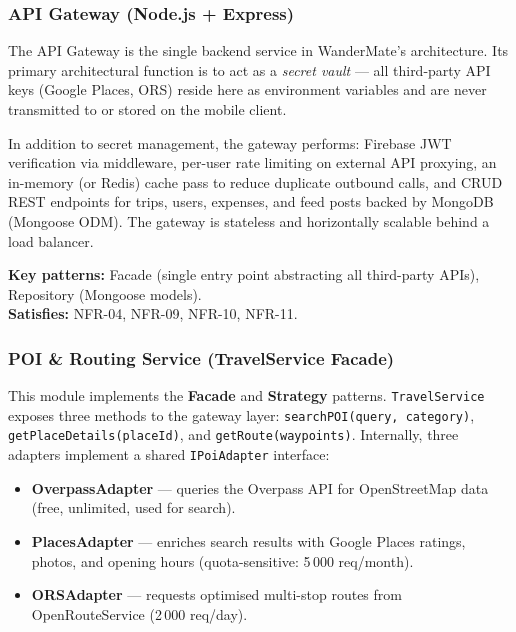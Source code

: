 \documentclass[12pt, a4paper]{article}
\begin{document}
\subsubsection{API Gateway (Node.js + Express)}

The API Gateway is the single backend service in WanderMate's architecture. Its primary architectural function is to act as a \emph{secret vault} --- all third-party API keys (Google Places, ORS) reside here as environment variables and are never transmitted to or stored on the mobile client.

In addition to secret management, the gateway performs: Firebase JWT verification via middleware, per-user rate limiting on external API proxying, an in-memory (or Redis) cache pass to reduce duplicate outbound calls, and CRUD REST endpoints for trips, users, expenses, and feed posts backed by MongoDB (Mongoose ODM). The gateway is stateless and horizontally scalable behind a load balancer.

\begin{tcolorbox}[notebox]
  \textbf{Key patterns:} Facade (single entry point abstracting all third-party APIs), Repository (Mongoose models).\\[2pt]
  \textbf{Satisfies:} NFR-04, NFR-09, NFR-10, NFR-11.
\end{tcolorbox}

\subsubsection{POI \& Routing Service (TravelService Facade)}

This module implements the \textbf{Facade} and \textbf{Strategy} patterns. \texttt{TravelService} exposes three methods to the gateway layer: \texttt{searchPOI(query, category)}, \texttt{getPlaceDetails(placeId)}, and \texttt{getRoute(waypoints)}. Internally, three adapters implement a shared \texttt{IPoiAdapter} interface:

\begin{itemize}
  \item \textbf{OverpassAdapter} --- queries the Overpass API for OpenStreetMap data (free, unlimited, used for search).
  \item \textbf{PlacesAdapter} --- enriches search results with Google Places ratings, photos, and opening hours (quota-sensitive: 5\,000 req/month).
  \item \textbf{ORSAdapter} --- requests optimised multi-stop routes from OpenRouteService (2\,000 req/day).
\end{itemize}
\end{document}
